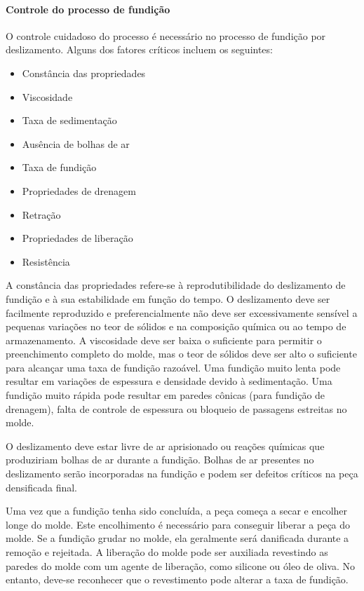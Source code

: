 \paragraph*{Controle do processo de fundição}

O controle cuidadoso do processo é necessário no processo de fundição por deslizamento. Alguns dos fatores críticos incluem os seguintes:

\begin{itemize}
    \item Constância das propriedades
    \item Viscosidade
    \item Taxa de sedimentação
    \item Ausência de bolhas de ar
    \item Taxa de fundição
    \item Propriedades de drenagem
    \item Retração
    \item Propriedades de liberação
    \item Resistência
\end{itemize}

A constância das propriedades refere-se à reprodutibilidade do deslizamento de fundição e à sua estabilidade em função do tempo. O deslizamento deve ser facilmente reproduzido e preferencialmente não deve ser excessivamente sensível a pequenas variações no teor de sólidos e na composição química ou ao tempo de armazenamento. A viscosidade deve ser baixa o suficiente para permitir o preenchimento completo do molde, mas o teor de sólidos deve ser alto o suficiente para alcançar uma taxa de fundição razoável. Uma fundição muito lenta pode resultar em variações de espessura e densidade devido à sedimentação. Uma fundição muito rápida pode resultar em paredes cônicas (para fundição de drenagem), falta de controle de espessura ou bloqueio de passagens estreitas no molde.

O deslizamento deve estar livre de ar aprisionado ou reações químicas que produziriam bolhas de ar durante a fundição. Bolhas de ar presentes no deslizamento serão incorporadas na fundição e podem ser defeitos críticos na peça densificada final.

Uma vez que a fundição tenha sido concluída, a peça começa a secar e encolher longe do molde. Este encolhimento é necessário para conseguir liberar a peça do molde. Se a fundição grudar no molde, ela geralmente será danificada durante a remoção e rejeitada. A liberação do molde pode ser auxiliada revestindo as paredes do molde com um agente de liberação, como silicone ou óleo de oliva. No entanto, deve-se reconhecer que o revestimento pode alterar a taxa de fundição.

